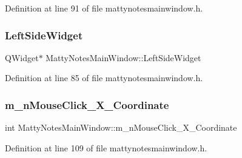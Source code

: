 Definition at line 91 of file mattynotesmainwindow.\+h.

\hypertarget{classMattyNotesMainWindow_adc593268179cbf4d75170b3b3ce02843}{}\label{classMattyNotesMainWindow_adc593268179cbf4d75170b3b3ce02843} 
\subsubsection{\texorpdfstring{Left\+Side\+Widget}{LeftSideWidget}}
{\footnotesize\ttfamily Q\+Widget$\ast$ Matty\+Notes\+Main\+Window\+::\+Left\+Side\+Widget\hspace{0.3cm}{\ttfamily [private]}}



Definition at line 85 of file mattynotesmainwindow.\+h.

\hypertarget{classMattyNotesMainWindow_a40aea49d6193169d442deffef9eaf580}{}\label{classMattyNotesMainWindow_a40aea49d6193169d442deffef9eaf580} 
\subsubsection{\texorpdfstring{m\+\_\+n\+Mouse\+Click\+\_\+\+X\+\_\+\+Coordinate}{m\_nMouseClick\_X\_Coordinate}}
{\footnotesize\ttfamily int Matty\+Notes\+Main\+Window\+::m\+\_\+n\+Mouse\+Click\+\_\+\+X\+\_\+\+Coordinate\hspace{0.3cm}{\ttfamily [private]}}



Definition at line 109 of file mattynotesmainwindow.\+h.

\hypertarget{classMattyNotesMainWindow_ac629bfbb61eee078fb9f4a7dfba5c22e}{}\label{classMattyNotesMainWindow_ac629bfbb61eee078fb9f4a7dfba5c22e} 
